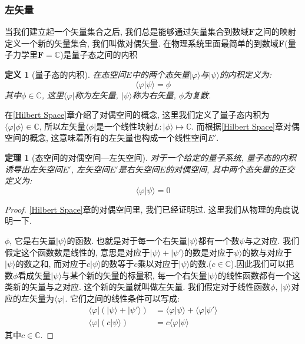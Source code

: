 \documentclass[a4paper,11pt]{article}
\newtheorem{definition}{\hspace{2em}定义}[section]
\newtheorem{theorem}{\hspace{2em}定理}[section]
\newtheorem{proof}{证明}[section]
\begin{document}
\subsubsection{左矢量}
当我们建立起一个矢量集合之后, 我们总是能够通过矢量集合到数域$\mathbf{F}$之间的映射定义一个新的矢量集合, 我们叫做对偶矢量. 在物理系统里面最简单的到数域$\mathbf{F}$(量子力学里$\mathbf{F}=\mathbb{C}$)是量子态之间的内积
\begin{definition}[量子态的内积]
  在态空间$E$中的两个态矢量$|\varphi\rangle$与$|\psi\rangle$的内积定义为:
\begin{equation*}
  \langle\varphi|\psi\rangle=\phi
\end{equation*}
其中$\phi\in\mathbb{C}$, 这里$\langle\varphi|$称为左矢量, $|\psi\rangle$称为右矢量, $\phi$为复数.
\end{definition}
在\ref{Hilbert Space}章介绍了对偶空间的概念, 这里我们定义了量子态内积为$\langle\varphi|\phi\rangle\in\mathbb{C}$, 所以左矢量$\langle\phi|$是一个线性映射$L:|\phi\rangle\longmapsto\mathbb{C}$. 而根据\ref{Hilbert Space}章对偶空间的概念, 这意味着所有的左矢量也构成一个线性空间$E'$.
\begin{theorem}[态空间的对偶空间---左矢空间]
  对于一个给定的量子系统, 量子态的内积诱导出左矢空间$E'$, 左矢空间$E'$是右矢空间$E$的对偶空间, 其中两个态矢量的正交定义为:
\begin{equation*}
  \langle\varphi|\psi\rangle=0
\end{equation*}
\end{theorem}
\begin{proof}
\ref{Hilbert Space}章的对偶空间里, 我们已经证明过. 这里我们从物理的角度说明一下.

$\phi$, 它是右矢量$|\psi\rangle$的函数. 也就是对于每一个右矢量$|\psi\rangle$都有一个数$\psi$与之对应. 我们假定这个函数数是线性的, 意思是对应于$|\psi\rangle+|\psi'\rangle$的数是对应于$\psi\rangle$的数与对应于$|\psi\rangle$的数之和, 而对应于$c|\psi\rangle$的数等于$c$乘以对应于$|\psi\rangle$的数.($c\in\mathbb{C}$).因此我们可以把数$\phi$看成矢量$|\psi\rangle$与某个新的矢量的标量积, 每一个右矢量$|\psi\rangle$的线性函数都有一个这类新的矢量与之对应. 这个新的矢量就叫做左矢量. 我们假定对于线性函数$\phi$, $|\psi\rangle$对应的左矢量为$\langle\varphi|$. 它们之间的线性条件可以写成:
\begin{equation}\label{leftvec add 1}
  \begin{split}
     \langle\varphi|(|\psi\rangle+|\psi'\rangle)&=\langle\varphi|\psi\rangle+\langle\varphi|\psi'\rangle \\
     \langle\varphi|(c|\psi\rangle)&=c\langle\varphi|\psi\rangle
  \end{split}
\end{equation}
其中$c\in\mathbb{C}$.
\end{proof}
\end{document}
